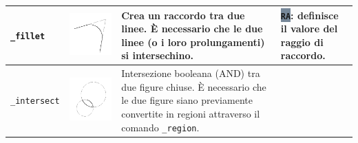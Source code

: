 \documentclass[..]{../IEEEphot}
\newcommand{\param}[1]{\colorbox{LightSlateGray}{\color{Navy}\texttt{\textbf{#1}}}}
\begin{document}
\begin{center}
\begin{longtable}{m{.2\linewidth}m{.2\linewidth}m{.25\linewidth}m{.25\linewidth}}
\\	
\midrule
\texttt{\_fillet} & \includegraphics[width = 0.8\linewidth, keepaspectratio]{../images/jpg/_fillet.jpg} & Crea un raccordo tra due linee. È necessario che le due linee (o i loro prolungamenti) si intersechino. & 
\param{RA}: definisce il valore del raggio di raccordo.
\\
\midrule
\texttt{\_intersect} & \includegraphics[width = 0.8\linewidth, keepaspectratio]{../images/jpg/_intersect.jpg} & Intersezione booleana (AND) tra due figure chiuse. È necessario che le due figure siano previamente convertite in regioni attraverso il comando \texttt{\_region}. & 

\end{longtable}
\end{center}
\end{document}
